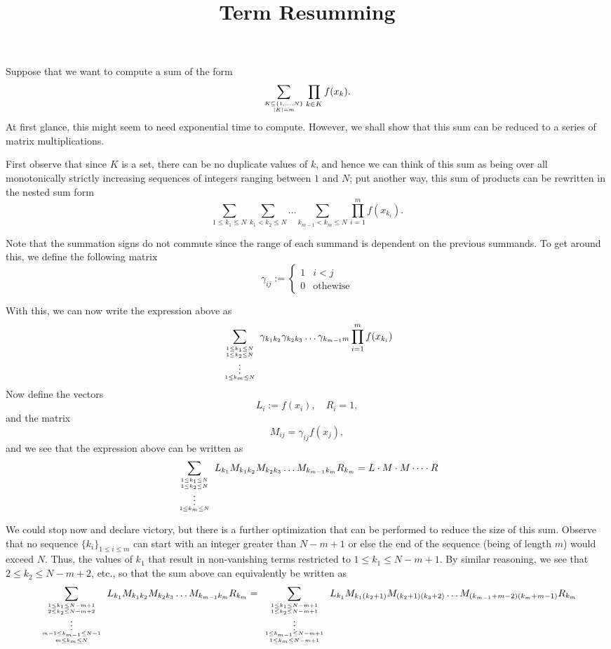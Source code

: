 \documentclass[onecolumn,amsmath,amssymb,nofootinbib,floatfix]{revtex4}
\title{Term Resumming}
\begin{document}
Suppose that we want to compute a sum of the form
$$\sum_{K\subseteq \{1,\dots,N\}\atop |K|=m} \prod_{k\in K} f(x_k).$$
At first glance, this might seem to need exponential time to compute.  However, we shall show that this sum can be reduced to a series of matrix multiplications.

First observe that since $K$ is a set, there can be no duplicate values of $k$, and hence we can think of this sum as being over all monotonically strictly increasing sequences of integers ranging between $1$ and $N$;  put another way, this sum of products can be rewritten in the nested sum form
$$\sum_{1 \le k_1 \le N} \sum_{k_1 < k_2 \le N} \dots \sum_{k_{m-1} < k_m \le N} \prod_{i=1}^m f(x_{k_i}).$$

Note that the summation signs do not commute since the range of each summand is dependent on the previous summands.  To get around this, we define the following matrix
$$\gamma_{ij}:=
\begin{cases}
1 & i < j \\
0 & \text{othewise}
\end{cases}
$$

With this, we can now write the expression above as
$$
\sum_{
1\le k_1\le N \atop {
1\le k_2\le N \atop {
\vdots \atop {
1\le k_m\le N
}}}}
\gamma_{k_1k_2}\gamma_{k_2k_3}\dots\gamma_{k_{m-1}m}
\prod_{i=1}^m f(x_{k_i})
$$
Now define the vectors
$$L_i := f(x_i), \quad R_i = 1,$$
and the matrix
$$M_{ij} = \gamma_{ij}f(x_j),$$
and we see that the expression above can be written as
$$
\sum_{
1\le k_1\le N \atop {
1\le k_2\le N \atop {
\vdots \atop {
1\le k_m\le N
}}}}
L_{k_1}M_{k_1k_2}M_{k_2k_3}\dots M_{k_{m-1}k_m} R_{k_m} = L\cdot M \cdot M \cdots \cdot R
$$

We could stop now and declare victory, but there is a further optimization that can be performed to reduce the size of this sum.  Observe that no sequence $\{k_i\}_{1\le i\le m}$ can start with an integer greater than $N-m+1$ or else the end of the sequence (being of length $m$) would exceed $N$.  Thus, the values of $k_1$ that result in non-vanishing terms restricted to $1\le k_1\le N-m+1$.  By similar reasoning, we see that $2\le k_2 \le N-m+2$, etc., so that the sum above can equivalently be written as
$$
\sum_{
1\le k_1\le N-m+1 \atop {
2\le k_2\le N-m+2 \atop {
\vdots \atop {
m-1\le k_{m-1}\le N-1 \atop {
m\le k_m\le N
}}}}}
L_{k_1}M_{k_1k_2}M_{k_2k_3}\dots M_{k_{m-1}k_m} R_{k_m}
=\sum_{
1\le k_1\le N-m+1 \atop {
1\le k_2\le N-m+1 \atop {
\vdots \atop {
1\le k_{m-1}\le N-m+1 \atop {
1\le k_m\le N-m+1
}}}}}
L_{k_1}M_{k_1(k_2+1)}M_{(k_2+1)(k_3+2)}\dots M_{(k_{m-1}+m-2)(k_m+m-1)} R_{k_m}
$$
\end{document}

